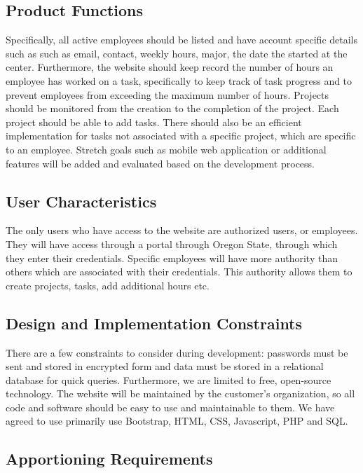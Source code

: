 \documentclass[letterpaper,10pt,titlepage,journal,compsoc,draftclsnofoot,onecolumn]{IEEEtran}
\begin{document}
\subsection{Product Functions}

Specifically, all active employees should be listed and have account specific details such as such as email, contact, weekly hours, major, the date the started at the center. Furthermore, the website should keep record the number of hours an employee has worked on a task, specifically to keep track of task progress and to prevent employees from exceeding the maximum number of hours. Projects should be monitored from the creation to the completion of the project. Each project should be able to add tasks. There should also be an efficient implementation for tasks not associated with a specific project, which are specific to an employee. Stretch goals such as mobile web application or additional features will be added and evaluated based on the development process. 

\subsection{User Characteristics}

The only users who have access to the website are authorized users, or employees. They will have access through a portal through Oregon State, through which they enter their credentials. Specific employees will have more authority than others which are associated with their credentials. This authority allows them to create projects, tasks, add additional hours etc.

\subsection{Design and Implementation Constraints}

There are a few constraints to consider during development: passwords must be sent and stored in encrypted form and data must be stored in a relational database for quick queries. Furthermore, we are limited to free, open-source technology. The website will be maintained by the customer’s organization, so all code and software should be easy to use and maintainable to them. We have agreed to use primarily use Bootstrap, HTML, CSS, Javascript, PHP and SQL.

\subsection{Apportioning Requirements}
\end{document}
